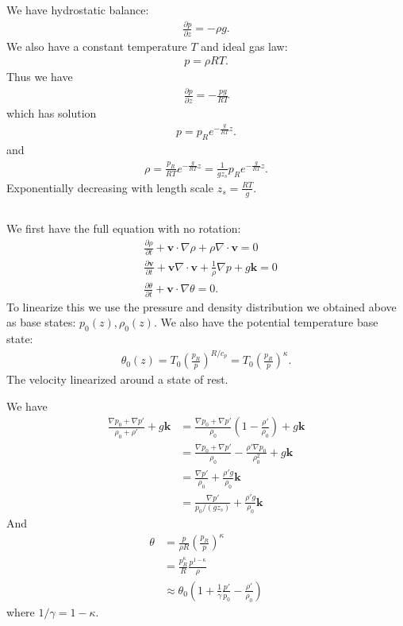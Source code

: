 \documentclass[11pt,letterpaper]{book}
\theoremstyle{definition}
\newcommand{\pe}{\partial}
\newcommand{\dsp}{\displaystyle}
\newcommand{\ve}[1]{\boldsymbol{#1}}
\begin{document}
\subsection{}
We have hydrostatic balance:
\begin{align*}
\frac{\pe p}{\pe z} = -\rho g.
\end{align*}
We also have a constant temperature $T$ and ideal gas law:
\begin{align*}
p = \rho R T.
\end{align*}
Thus we have
\begin{align*}
\frac{\pe p}{\pe z} = -\frac{p g}{RT}
\end{align*}
which has solution
\begin{align*}
p = p_R e^{-\frac{g}{RT}z}.
\end{align*}
and 
\begin{align*}
\rho = \frac{p_R}{RT} e^{-\frac{g}{RT}z} = \frac{1}{gz_s} p_Re^{-\frac{g}{RT}z}.
\end{align*}
Exponentially decreasing with length scale $z_s = \dsp{\frac{RT}{g}}$.

\subsection{}
We first have the full equation with no rotation:
\begin{align*}
& \frac{\pe\rho}{\pe t}+\ve v \cdot\nabla \rho+\rho\nabla\cdot\ve v = 0\\
& \frac{\pe\ve v}{\pe t}+\ve v\nabla\cdot \ve v+\frac{1}{\rho}\nabla p+g\ve k = 0\\
& \frac{\pe\theta}{\pe t}+\ve v\cdot\nabla\theta = 0.
\end{align*}
To linearize this we use the pressure and density distribution we obtained above as base states: $p_0(z), \rho_0(z)$. We also have the potential temperature base state:
\begin{align*}
\theta_0(z) = T_0\left(\frac{p_R}{p}\right)^{R/c_p} = T_0\left(\frac{p_R}{p}\right)^{\kappa}.
\end{align*}
The velocity linearized around a state of rest.

We have
\begin{align*}
\frac{\nabla p_0+\nabla p'}{\rho_0+\rho'}+g\ve k &= \frac{\nabla p_0+\nabla p'}{\rho_0}\left(1-\frac{\rho'}{\rho_0}\right)+g\ve k\\
&= \frac{\nabla p_0+\nabla p'}{\rho_0}-\frac{\rho'\nabla p_0}{\rho_0^2}+g\ve k\\
&= \frac{\nabla p'}{\rho_0}+\frac{\rho'g}{\rho_0}\ve k\\
&= \frac{\nabla p'}{p_0/(gz_s)}+\frac{\rho'g}{\rho_0}\ve k
\end{align*}
And
\begin{align*}
\theta &= \frac{p}{\rho R}\left(\frac{p_R}{p}\right)^\kappa\\
&= \frac{p_R^\kappa}{R}\frac{p^{1-\kappa}}{\rho}\\
&\approx \theta_0\left( 1+\frac{1}{\gamma}\frac{p'}{p_0}-\frac{\rho'}{\rho_0} \right)
\end{align*}
where $1/\gamma = 1-\kappa$.
\end{document}
